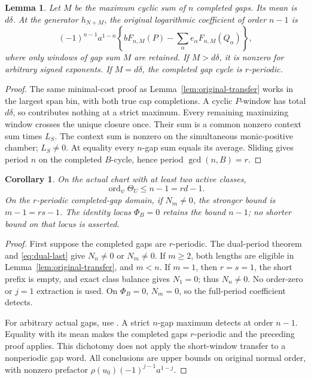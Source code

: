 \documentclass[11pt,a4paper]{amsart}
\numberwithin{equation}{section}
\theoremstyle{plain}
\newtheorem{lemma}[theorem]{Lemma}
\newtheorem{corollary}[theorem]{Corollary}
\theoremstyle{definition}
\begin{document}
\begin{lemma}\label{lem:maximal-bin}
Let \(M\) be the maximum cyclic sum of \(n\) completed gaps.  Its mean is \(d\delta\).  At the generator \(h_{N+M}\), the original logarithmic coefficient of order \(n-1\) is
\[
 (-1)^{n-1}a^{1-n}\left\{bF_{n,M}(P)-\sum_\alpha e_\alpha F_{n,M}(Q_\alpha)\right\},
\]
where only windows of gap sum \(M\) are retained.  If \(M>d\delta\), it is nonzero for arbitrary signed exponents.  If \(M=d\delta\), the completed gap cycle is \(r\)-periodic.
\end{lemma}
\begin{proof}
The same minimal-cost proof as Lemma~\ref{lem:original-transfer} works in the largest span bin, with both true cap completions.  A cyclic \(P\)-window has total \(d\delta\), so contributes nothing at a strict maximum.  Every remaining maximizing window crosses the unique closure once.  Their sum is a common nonzero context sum times \(L_S\).  The context sum is nonzero on the simultaneous monic-positive chamber; \(L_S\ne0\).  At equality every \(n\)-gap sum equals its average.  Sliding gives period \(n\) on the completed \(B\)-cycle, hence period \(\gcd(n,B)=r\).
\end{proof}

\begin{corollary}\label{cor:many-active}
On the actual chart with at least two active classes,
\[
 \operatorname{ord}_{\psi}\Theta_U\le n-1=rd-1.
\]
On the \(r\)-periodic completed-gap domain, if \(N_m\ne0\), the stronger bound is \(m-1=rs-1\).  The identity locus \(\Phi_B=0\) retains the bound \(n-1\); no shorter bound on that locus is asserted.
\end{corollary}
\begin{proof}
First suppose the completed gaps are \(r\)-periodic.  The dual-period theorem and \eqref{eq:dual-last} give \(N_n\ne0\) or \(N_m\ne0\).  If \(m\ge2\), both lengths are eligible in Lemma~\ref{lem:original-transfer}, and \(m<n\).  If \(m=1\), then \(r=s=1\), the short prefix is empty, and exact class balance gives \(N_1=0\); thus \(N_n\ne0\).  No order-zero or \(j=1\) extraction is used.  On \(\Phi_B=0\), \(N_m=0\), so the full-period coefficient detects.

For arbitrary actual gaps, use .  A strict \(n\)-gap maximum detects at order \(n-1\).  Equality with its mean makes the completed gaps \(r\)-periodic and the preceding proof applies.  This dichotomy does not apply the short-window transfer to a nonperiodic gap word.  All conclusions are upper bounds on original normal order, with nonzero prefactor \(\rho(u_0)(-1)^{j-1}a^{1-j}\).
\end{proof}
\end{document}
